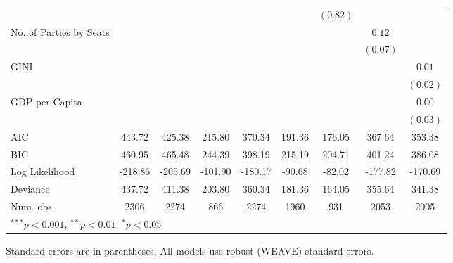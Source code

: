 \documentclass[a4paper]{article}\usepackage[]{graphicx}\usepackage[]{color}
\begin{document}
\begin{table}
\begin{center}
{\begin{tabular}{l c c c c c c c c }
                        &               &               &               &              &              & $(0.82)$     &               &              \\
No. of Parties by Seats &               &               &               &              &              &              & $0.12$        &              \\
                        &               &               &               &              &              &              & $(0.07)$      &              \\
GINI                    &               &               &               &              &              &              &               & $0.01$       \\
                        &               &               &               &              &              &              &               & $(0.02)$     \\
GDP per Capita          &               &               &               &              &              &              &               & $0.00$       \\
                        &               &               &               &              &              &              &               & $(0.03)$     \\
\hline
AIC                     & 443.72        & 425.38        & 215.80        & 370.34       & 191.36       & 176.05       & 367.64        & 353.38       \\
BIC                     & 460.95        & 465.48        & 244.39        & 398.19       & 215.19       & 204.71       & 401.24        & 386.08       \\
Log Likelihood          & -218.86       & -205.69       & -101.90       & -180.17      & -90.68       & -82.02       & -177.82       & -170.69      \\
Deviance                & 437.72        & 411.38        & 203.80        & 360.34       & 181.36       & 164.05       & 355.64        & 341.38       \\
Num. obs.               & 2306          & 2274          & 866           & 2274         & 1960         & 931          & 2053          & 2005         \\
\hline
\multicolumn{9}{l}{\scriptsize{$^{***}p<0.001$, $^{**}p<0.01$, $^*p<0.05$}}
\end{tabular}

}
\end{center}
{\scriptsize{
    Standard errors are in parentheses. All models use robust (WEAVE) standard errors. \\
}}
\end{table}
\end{document}
